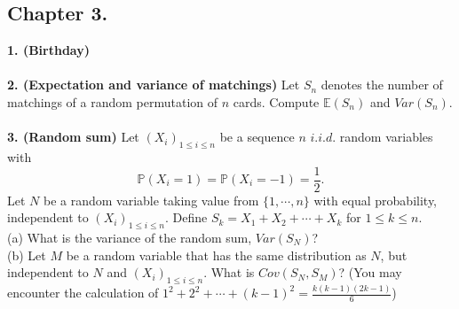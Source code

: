 \documentclass[12pt]{article}
\begin{document}
\subsection*{Chapter 3.}
\textbf{1. (Birthday)}
\\ \\
\textbf{2. (Expectation and variance of matchings)} Let $S_n$ denotes the number of matchings of a random permutation of $n$ cards. Compute $\mathbb{E}(S_n)$ and $Var(S_n)$.
\\ \\
\textbf{3. (Random sum)} Let $(X_i)_{1\leq i\leq n}$ be a sequence $n$ $i.i.d.$ random variables with
\begin{equation*}
\mathbb{P}(X_i=1)=\mathbb{P}(X_i=-1)=\frac{1}{2}.
\end{equation*}
Let $N$ be a random variable taking value from $\{1,\cdots,n\}$ with equal probability, independent to $(X_i)_{1\leq i\leq n}$. Define $S_k=X_1+X_2+\cdots+X_k$ for $1\leq k\leq n$.\\
(a) What is the variance of the random sum, $Var(S_N)$? \\
(b) Let $M$ be a random variable that has the same distribution as $N$, but independent to $N$ and $(X_i)_{1\leq i\leq n}$. What is $Cov(S_N,S_M)$? (You may encounter the calculation of $1^2+2^2+\cdots+(k-1)^2=\frac{k(k-1)(2k-1)}{6}$)



\newpage
\end{document}
